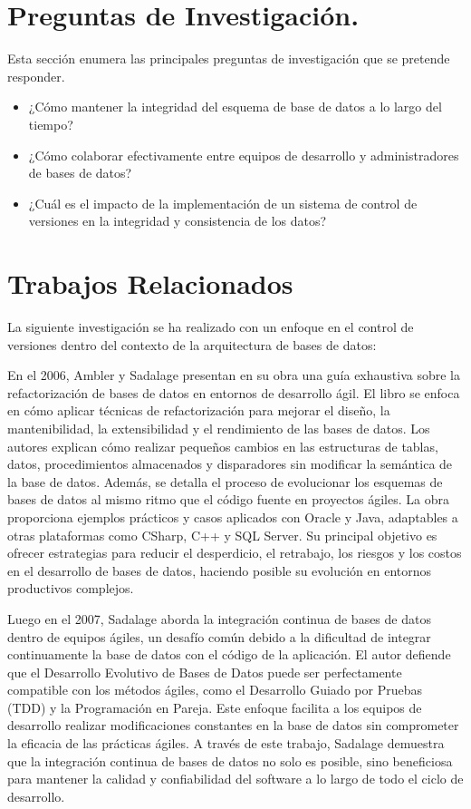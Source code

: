 \documentclass{IEEEtran}
\begin{document}
\section{Preguntas de Investigación.}
Esta sección enumera las principales preguntas de investigación que se pretende responder.
\begin{itemize}
    \item ¿Cómo mantener la integridad del esquema de base de datos a lo largo del tiempo? 
    \item ¿Cómo colaborar efectivamente entre equipos de desarrollo y administradores de bases de datos? 
    \item ¿Cuál es el impacto de la implementación de un sistema de control de versiones en la integridad y consistencia de los datos?
\end{itemize}


\section{Trabajos Relacionados}
La siguiente investigación se ha realizado con un enfoque en el control de versiones dentro del contexto de la arquitectura de bases de datos:

En el 2006, Ambler y Sadalage \cite{ambler2006refactoring} presentan en su obra una guía exhaustiva sobre la refactorización de bases de datos en entornos de desarrollo ágil. El libro se enfoca en cómo aplicar técnicas de refactorización para mejorar el diseño, la mantenibilidad, la extensibilidad y el rendimiento de las bases de datos. Los autores explican cómo realizar pequeños cambios en las estructuras de tablas, datos, procedimientos almacenados y disparadores sin modificar la semántica de la base de datos. Además, se detalla el proceso de evolucionar los esquemas de bases de datos al mismo ritmo que el código fuente en proyectos ágiles. La obra proporciona ejemplos prácticos y casos aplicados con Oracle y Java, adaptables a otras plataformas como CSharp, C++ y SQL Server. Su principal objetivo es ofrecer estrategias para reducir el desperdicio, el retrabajo, los riesgos y los costos en el desarrollo de bases de datos, haciendo posible su evolución en entornos productivos complejos.

Luego en el 2007, Sadalage \cite{sadalage2007recipes} aborda la integración continua de bases de datos dentro de equipos ágiles, un desafío común debido a la dificultad de integrar continuamente la base de datos con el código de la aplicación. El autor defiende que el Desarrollo Evolutivo de Bases de Datos puede ser perfectamente compatible con los métodos ágiles, como el Desarrollo Guiado por Pruebas (TDD) y la Programación en Pareja. Este enfoque facilita a los equipos de desarrollo realizar modificaciones constantes en la base de datos sin comprometer la eficacia de las prácticas ágiles. A través de este trabajo, Sadalage demuestra que la integración continua de bases de datos no solo es posible, sino beneficiosa para mantener la calidad y confiabilidad del software a lo largo de todo el ciclo de desarrollo.
\end{document}
